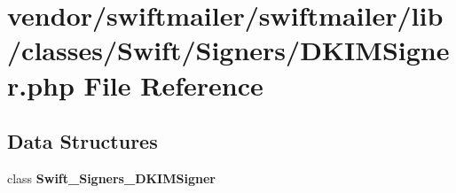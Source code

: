 \section{vendor/swiftmailer/swiftmailer/lib/classes/\+Swift/\+Signers/\+D\+K\+I\+M\+Signer.php File Reference}
\label{_d_k_i_m_signer_8php}
\subsection*{Data Structures}
\begin{DoxyCompactItemize}
\item 
class {\bf Swift\+\_\+\+Signers\+\_\+\+D\+K\+I\+M\+Signer}
\end{DoxyCompactItemize}
